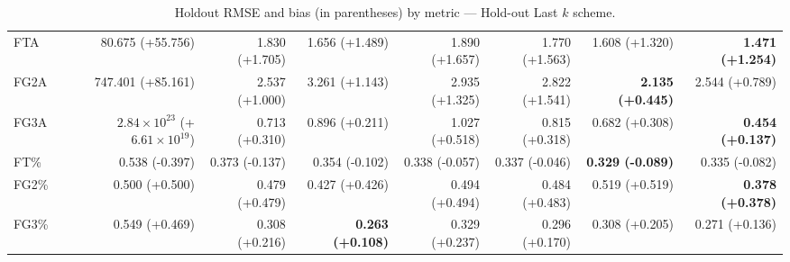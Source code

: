 \begin{table}[H]
{\begin{tabular}{lrrrrrrr}
FTA & 80.675 (+55.756) & 1.830 (+1.705) & 1.656 (+1.489) & 1.890 (+1.657) & 1.770 (+1.563) & 1.608 (+1.320) & \textbf{1.471 (+1.254)} \\
FG2A & 747.401 (+85.161) & 2.537 (+1.000) & 3.261 (+1.143) & 2.935 (+1.325) & 2.822 (+1.541) & \textbf{2.135 (+0.445)} & 2.544 (+0.789) \\
FG3A & $2.84\times10^{23}$ (+$6.61\times10^{19}$) & 0.713 (+0.310) & 0.896 (+0.211) & 1.027 (+0.518) & 0.815 (+0.318) & 0.682 (+0.308) & \textbf{0.454 (+0.137)} \\
FT\% & 0.538 (-0.397) & 0.373 (-0.137) & 0.354 (-0.102) & 0.338 (-0.057) & 0.337 (-0.046) & \textbf{0.329 (-0.089)} & 0.335 (-0.082) \\
FG2\% & 0.500 (+0.500) & 0.479 (+0.479) & 0.427 (+0.426) & 0.494 (+0.494) & 0.484 (+0.483) & 0.519 (+0.519) & \textbf{0.378 (+0.378)} \\
FG3\% & 0.549 (+0.469) & 0.308 (+0.216) & \textbf{0.263 (+0.108)} & 0.329 (+0.237) & 0.296 (+0.170) & 0.308 (+0.205) & 0.271 (+0.136) \\
\bottomrule
\end{tabular}
}
\caption{Holdout RMSE and bias (in parentheses) by metric — Hold-out Last $k$ scheme.}
\label{tab:coverage_holdout_last_k}
\end{table}

